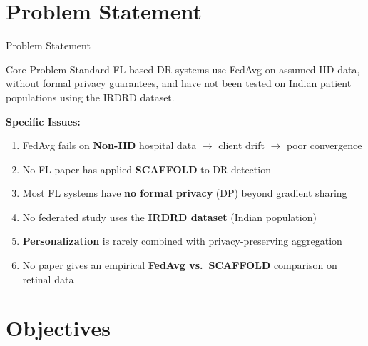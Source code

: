 \documentclass[aspectratio=169, 11pt]{beamer}
\begin{document}
\section{Problem Statement}

\begin{frame}{Problem Statement}
  \begin{alertblock}{Core Problem}\small
    Standard FL-based DR systems use FedAvg on assumed IID data, without formal privacy guarantees, and have not been tested on Indian patient populations using the IRDRD dataset.
  \end{alertblock}
  \vspace{6pt}
  \textbf{Specific Issues:}
  \begin{enumerate}\small
    \item FedAvg fails on \textbf{Non-IID} hospital data $\rightarrow$ client drift $\rightarrow$ poor convergence
    \item No FL paper has applied \textbf{SCAFFOLD} to DR detection
    \item Most FL systems have \textbf{no formal privacy} (DP) beyond gradient sharing
    \item No federated study uses the \textbf{IRDRD dataset} (Indian population)
    \item \textbf{Personalization} is rarely combined with privacy-preserving aggregation
    \item No paper gives an empirical \textbf{FedAvg vs.\ SCAFFOLD} comparison on retinal data
  \end{enumerate}
\end{frame}

\section{Objectives}
\end{document}
